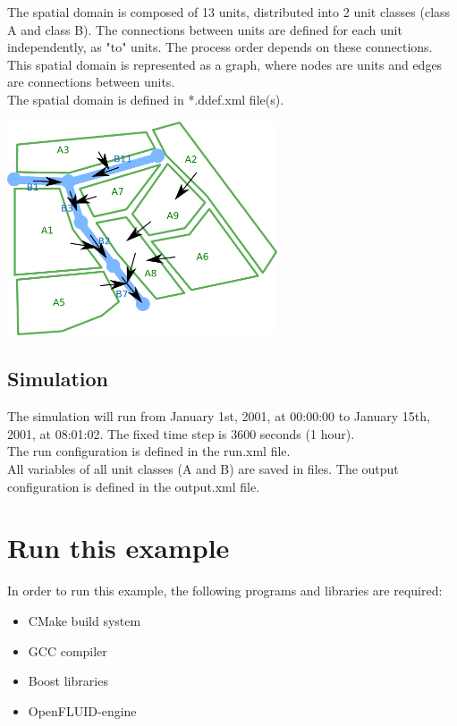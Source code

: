 \documentclass[a4paper,11pt]{article}
\begin{document}
The spatial domain is composed of 13 units, distributed into 2 unit classes 
(class A and class B). The connections between 
units are defined for each unit independently, as "to" units. The process order 
depends on these connections. This spatial domain is represented as a graph, 
where nodes are units and edges are connections between units.\\
The spatial domain is defined in *.ddef.xml file(s). 

\begin{center}
\includegraphics[width=8cm]{openfluid-engine_example-primitives_en/domain.png}
\end{center}


\bigskip
\bigskip

\subsection{Simulation}

The simulation will run from January 1st, 2001, at 00:00:00 to January 15th, 2001, at 08:01:02.
The fixed time step is 3600 seconds (1 hour).\\
\noindent The run configuration is defined in the run.xml file.\\

\noindent All variables of all unit classes (A and B) are saved in files. The output
configuration is defined in the output.xml file.

\bigskip
\bigskip

\section{Run this example}

In order to run this example, the following programs and libraries are required:
\begin{itemize}
\item CMake build system
\item GCC compiler
\item Boost libraries
\item OpenFLUID-engine
\end{itemize}
\end{document}
